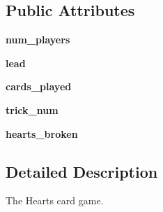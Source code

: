 \subsection*{Public Attributes}
\begin{DoxyCompactItemize}
\item 
\hypertarget{classcards-with-friends_1_1games_1_1hearts_1_1_hearts_a30da649bd6eafe45c045e30032922b01}{{\bfseries num\-\_\-players}}\label{classcards-with-friends_1_1games_1_1hearts_1_1_hearts_a30da649bd6eafe45c045e30032922b01}

\item 
\hypertarget{classcards-with-friends_1_1games_1_1hearts_1_1_hearts_ac0dc4138454e9f661e183bd1e816f8e7}{{\bfseries lead}}\label{classcards-with-friends_1_1games_1_1hearts_1_1_hearts_ac0dc4138454e9f661e183bd1e816f8e7}

\item 
\hypertarget{classcards-with-friends_1_1games_1_1hearts_1_1_hearts_a334b803060353eadafeccd821ef19d07}{{\bfseries cards\-\_\-played}}\label{classcards-with-friends_1_1games_1_1hearts_1_1_hearts_a334b803060353eadafeccd821ef19d07}

\item 
\hypertarget{classcards-with-friends_1_1games_1_1hearts_1_1_hearts_a05e0e2f500277376a9bce951c6afffbb}{{\bfseries trick\-\_\-num}}\label{classcards-with-friends_1_1games_1_1hearts_1_1_hearts_a05e0e2f500277376a9bce951c6afffbb}

\item 
\hypertarget{classcards-with-friends_1_1games_1_1hearts_1_1_hearts_a857741e4ede3fc25c2d431b25f9e0a95}{{\bfseries hearts\-\_\-broken}}\label{classcards-with-friends_1_1games_1_1hearts_1_1_hearts_a857741e4ede3fc25c2d431b25f9e0a95}

\end{DoxyCompactItemize}


\subsection{Detailed Description}
\begin{DoxyVerb}The Hearts card game.\end{DoxyVerb}
 

